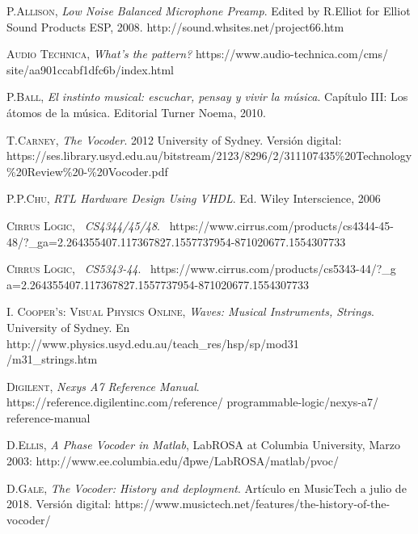 \documentclass[a4paper, 11pt, oneside, openright]{report}
\begin{document}
\begin{thebibliography}{aa}


	\textsc{P.Allison},
	\textit{Low Noise Balanced Microphone Preamp}.
	Edited by R.Elliot for	
	Elliot Sound Products ESP, 2008.
	http://sound.whsites.net/project66.htm
	
	\textsc{Audio Technica},
	\textit{What's the pattern?}
	https://www.audio-technica.com/cms/ site/aa901ccabf1dfc6b/index.html
	
	\textsc{P.Ball},
	\textit{El instinto musical: escuchar, pensay y vivir la música}. Capítulo III: Los átomos de la música. Editorial Turner Noema, 2010.
	
	\textsc{T.Carney},
	\textit{The Vocoder}. 2012 University of Sydney. Versión digital:
	https://ses.library.usyd.edu.au/bitstream/2123/8296/2/311107435\%20Technology\\\%20Review\%20-\%20Vocoder.pdf
	
	\textsc{P.P.Chu},
	\textit{RTL Hardware Design Using VHDL}.
	Ed. Wiley Interscience, 2006
	
	\textsc{Cirrus Logic},~
	\textit{CS4344/45/48}.~
	https://www.cirrus.com/products/cs4344-45-48/?\_ga=2.264355407.117367827.1557737954-871020677.1554307733
	
	\textsc{Cirrus Logic},~
	\textit{CS5343-44}.~
	https://www.cirrus.com/products/cs5343-44/?\_g a=2.264355407.117367827.1557737954-871020677.1554307733
	
	\textsc{I. Cooper's: Visual Physics Online},
	\textit{Waves: Musical Instruments, Strings}. University of Sydney. En
	http://www.physics.usyd.edu.au/teach\_res/hsp/sp/mod31\\/m31\_strings.htm
	
	\textsc{Digilent},
	\textit{Nexys A7 Reference Manual}.
	https://reference.digilentinc.com/reference/ programmable-logic/nexys-a7/	  reference-manual
	
	\textsc{D.Ellis},
	\textit{A Phase Vocoder in Matlab},
	LabROSA at Columbia University,
	Marzo 2003: 
	http://www.ee.columbia.edu/\~dpwe/LabROSA/matlab/pvoc/
	
	\textsc{D.Gale},
	\textit{The Vocoder: History and deployment}. Artículo en MusicTech a julio de 2018. Versión digital:
	https://www.musictech.net/features/the-history-of-the-vocoder/


\end{thebibliography}
\end{document}

